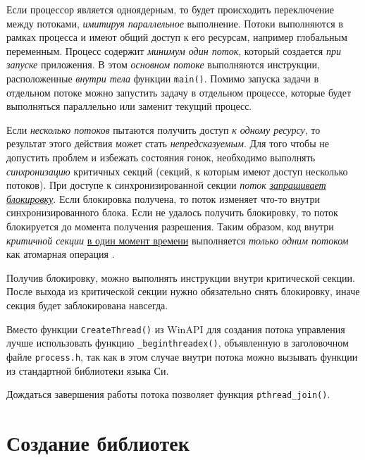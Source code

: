 \documentclass[%
	11pt,
	a4paper,
	utf8,
		]{article}
\begin{document}
Если процессор является одноядерным, то будет происходить переключение между потоками, \emph{имитируя параллельное} выполнение. Потоки выполняются в рамках процесса и имеют общий доступ к его ресурсам, например глобальным переменным. Процесс содержит \emph{минимум один поток}, который создается \emph{при запуске} приложения. В этом \emph{основном потоке} выполняются инструкции, расположенные \emph{внутри тела} функции \verb|main()|. Помимо запуска задачи в отдельном потоке можно запустить задачу в отдельном процессе, которые будет выполняться параллельно или заменит текущий процесс.

Если \emph{несколько потоков} пытаются получить доступ \emph{к одному ресурсу}, то результат этого действия может стать \emph{непредсказуемым}. Для того чтобы не допустить проблем и избежать состояния гонок, необходимо выполнять \emph{синхронизацию} критичных секций (секций, к которым имеют доступ несколько потоков). При доступе к синхронизированной секции \emph{поток} \underline{\itshape запрашивает блокировку}. Если блокировка получена, то поток изменяет что-то внутри синхронизированного блока. Если не удалось получить блокировку, то поток блокируется до момента получения разрешения. {\color{blue}Таким образом, код внутри \emph{критичной секции} \underline{в один момент времени} выполняется \emph{только одним потоком} как атомарная операция} \cite[]{prokhorenok-prog-c:2020}.


Получив блокировку, можно выполнять инструкции внутри критической секции. После выхода из критической секции нужно обязательно снять блокировку, иначе секция будет заблокирована навсегда.

Вместо функции \verb|CreateThread()| из WinAPI для создания потока управления лучше использовать функцию \verb|_beginthreadex()|, объявленную в заголовочном файле \verb|process.h|, так как в этом случае внутри потока можно вызывать функции из стандартной библиотеки языка Си.

Дождаться завершения работы потока позволяет функция \verb|pthread_join()|.

\section{Создание библиотек}
\end{document}
